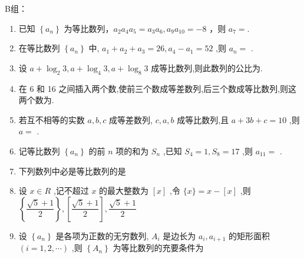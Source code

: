 B组：
\begin{enumerate}
    \item 已知 $\left\{a_n\right\}$ 为等比数列，$a_2 a_4 a_5=a_3 a_6, a_9 a_{10}=-8$ ，则 $a_7=$.
    
    \item 在等比数列 $\left\{  {a}_{n}\right\}$ 中, ${a}_{1} + {a}_{2} + {a}_{3} = {26},{a}_{4} - {a}_{1} = {52}$ ,则 ${a}_{n} =$ .
    
    \item 设 $a + {\log }_{2}3,a + {\log }_{4}3,a + {\log }_{8}3$ 成等比数列,则此数列的公比为.
    
    \item 在 6 和 16 之间插入两个数,使前三个数成等差数列,后三个数成等比数列,则这两个数为.
    
    \item 若互不相等的实数 $a,b,c$ 成等差数列, $c,a,b$ 成等比数列,且 $a + {3b} + c = {10}$ ,则 $a =$ .
    
    
    \item 记等比数列 $\left\{  {a}_{n}\right\}$ 的前 $n$ 项的和为 ${S}_{n}$ ,已知 ${S}_{4} = 1,{S}_{8} = {17}$ ,则 ${a}_{11} =$ .
    
    \item 下列数列中必是等比数列的是 
    
    \item 设 $x \in  R$ ,记不超过 $x$ 的最大整数为 $\left\lbrack  x\right\rbrack$ ,令 $\{ x\}  = x - \left\lbrack  x\right\rbrack$ ,则 $\left\{  \dfrac{\sqrt{5} + 1}{2}\right\}  ,\left\lbrack  \dfrac{\sqrt{5} + 1}{2}\right\rbrack  ,\dfrac{\sqrt{5} + 1}{2}$ 
    
    
    \item 设 $\left\{  {a}_{n}\right\}$ 是各项为正数的无穷数列, ${A}_{i}$ 是边长为 ${a}_{i},{a}_{i + 1}$ 的矩形面积 $\left( {i = 1,2,\cdots }\right)$ ,则 $\left\{  {A}_{n}\right\}$ 为等比数列的充要条件为
    

\end{enumerate}
